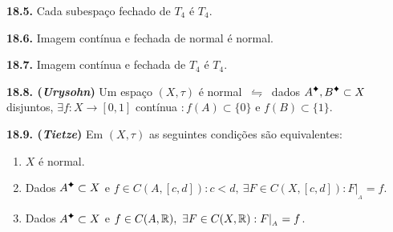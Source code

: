 \begin{corollary}
    \textbf{18.5.} Cada subespaço fechado de \(T_4\) é \(T_4\).  
\end{corollary}

\hypertarget{prop186}{}
\begin{proposition}
    \textbf{18.6.} Imagem contínua e fechada de normal é normal. 
\end{proposition}


\begin{corollary}
    \textbf{18.7.} Imagem contínua e fechada de \(T_4\) é \(T_4\). 
\end{corollary}

\hypertarget{lemma188}{}
\begin{lemma}
    \textbf{18.8. (\emph{Urysohn})} Um espaço \((X, \tau)\) é normal \(\ \leftrightharpoons \ \) dados \(A\ce, B\ce \subset X\) disjuntos, \(\exists f : X \to [0,1]\) contínua \(: f(A) \subset \{0\}\) e \(f(B) \subset \{1\}\). 
\end{lemma}


\begin{theorem}
    \textbf{18.9. (\emph{Tietze})} Em \((X, \tau)\) as seguintes condições são equivalentes:  
    \vspace{-0.3cm}
    \begin{enumerate}[label = (\alph*), left = 0.6cm]
        \item \(X\) é normal. 
        \item Dados \(A\ce \subset X\) e \(f \in C(A,[c,d]) : c<d, \  \exists F \in C (X , [c,d]): F|_{_A} = f\). 
        \item Dados \(A\ce \subset X\) e \(f \in C(A, \mathbb{R}), \ \exists F \in C(X, \mathbb{R}) : F|_{_A} = f\). 
    \end{enumerate}
\end{theorem}

